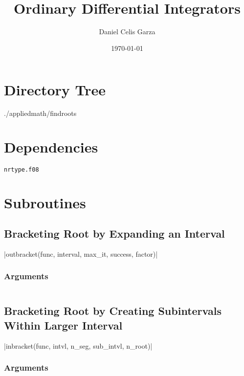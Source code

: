 \documentclass[11pt,a4paper]{article}
\title{Ordinary Differential Integrators}
\author{Daniel Celis Garza}
\date{\today}
\begin{document}
	\maketitle

	\section{Directory Tree}
		{\ubuntumono ./applied\textunderscore math/find\textunderscore roots}

	\section{Dependencies}
		\texttt{nrtype.f08}

	\section{Subroutines}
		\subsection{Bracketing Root by Expanding an Interval}
			|outbracket(func, interval, max_it, success, factor)|
			\subsubsection{Arguments}
				\inputminted[firstline=15, lastline=57]{fortran}{../find_roots.f08}
				
		\subsection{Bracketing Root by Creating Subintervals Within Larger Interval}
					|inbracket(func, intvl, n_seg, sub_intvl, n_root)|
					\subsubsection{Arguments}
						\inputminted[firstline=100, lastline=142]{fortran}{../find_roots.f08}
		
\end{document}
